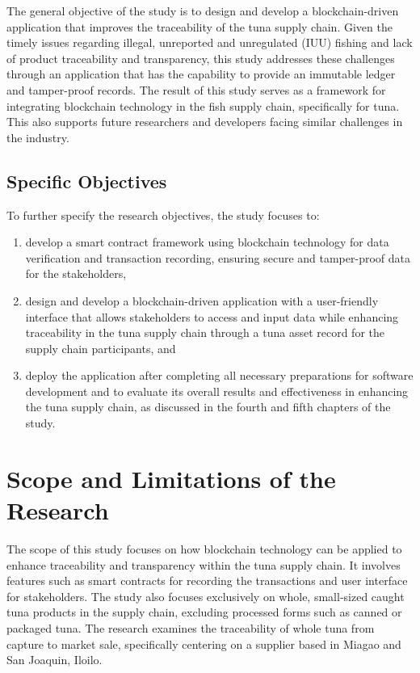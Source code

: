 The general objective of the study is to design and develop a blockchain-driven application that improves the traceability of the tuna supply chain. Given the timely issues regarding illegal, unreported and unregulated (IUU) fishing and lack of product traceability and transparency, this study addresses these challenges through an application that has the capability to provide an immutable ledger and tamper-proof records. The result of this study serves as a framework for integrating blockchain technology in the fish supply chain, specifically for tuna. This also supports future researchers and developers facing similar challenges in the industry.


\subsection{Specific Objectives}
\label{sec:specificobjectives}

To further specify the research objectives, the study focuses to:

\begin{enumerate}
	
	\item develop a smart contract framework using blockchain technology for data verification and transaction recording, ensuring secure and tamper-proof data for the stakeholders,
	\item design and develop a blockchain-driven application with a user-friendly interface that allows stakeholders to access and input data while enhancing traceability in the tuna supply chain through a tuna asset record for the supply chain participants, and 
	\item deploy the application after completing all necessary preparations for software development and to evaluate its overall results and effectiveness in enhancing the tuna supply chain, as discussed in the fourth and fifth chapters of the study.
\end{enumerate}


\section{Scope and Limitations of the Research}
\label{sec:scopelimitations}

The scope of this study focuses on how blockchain technology can be applied to enhance traceability and transparency within the tuna supply chain. It involves features such as smart contracts for recording the transactions and user interface for stakeholders. The study also focuses exclusively on whole, small-sized caught tuna products in the supply chain, excluding processed forms such as canned or packaged tuna. The research examines the traceability of whole tuna from capture to market sale, specifically centering on a supplier based in Miagao and San Joaquin, Iloilo. 

